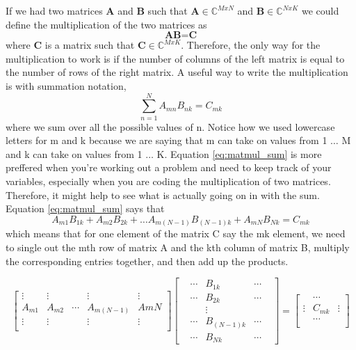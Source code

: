 \documentclass{article}
\newcommand{\be}{\begin{equation}}
\newcommand{\ee}{\end{equation}}
\begin{document}
If we had two matrices \textbf{A} and \textbf{B} such that $\textbf{A} \in \mathbb{C}^{MxN}$ and $\textbf{B} \in \mathbb{C}^{NxK}$ we could define the multiplication of the two matrices as
\be \label{eq:matmul}
  \textbf{A} \textbf{B} = \textbf{C}
\ee
where \textbf{C} is a matrix such that $\textbf{C} \in \mathbb{C}^{MxK}$.
Therefore, the only way for the multiplication to work is if the number of columns of the left matrix is equal to the number of rows of the right matrix.
A useful way to write the multiplication is with summation notation,
\be \label{eq:matmul_sum}
  \sum\limits_{n=1}^{N} A_{mn} B_{nk} = C_{mk}
\ee
where we sum over all the possible values of n.
Notice how we used lowercase letters for m and k because we are saying that m can take on values from 1 $\hdots$ M and k can take on values from 1 $\hdots$ K.
Equation \ref{eq:matmul_sum} is more preffered when you're working out a problem and need to keep track of your variables, especially when you are coding the multiplication of two matrices.
Therefore, it might help to see what is actually going on in with the sum.
Equation \ref{eq:matmul_sum} says that
\be
  A_{m1} B_{1k} + A_{m2} B_{2k} + \hdots A_{m(N-1)} B_{(N-1)k} + A_{mN} B_{Nk} = C_{mk}
\ee
which means that for one element of the matrix C say the mk element, we need to single out the mth row of matrix A and the kth column of matrix B, multiply the corresponding entries together, and then add up the products.

\[
\begin{bmatrix}
  \vdots & \vdots & & \vdots & \vdots \\
  A_{m1} & A_{m2} & \cdots & A_{m(N-1)} & A{mN} \\
  \vdots & \vdots & & \vdots & \vdots \\
\end{bmatrix}
\begin{bmatrix}
  & \cdots & B_{1k} & \cdots & \\
  & \cdots & B_{2k} & \cdots & \\
  & & \vdots & & \\
  & \cdots & B_{(N-1)k} & \cdots & \\
  & \cdots & B_{Nk} & \cdots &
\end{bmatrix}
=
\begin{bmatrix}
   & \cdots & \\
  \vdots & C_{mk} & \vdots \\
   & \cdots & \\
\end{bmatrix}
\]
\end{document}
